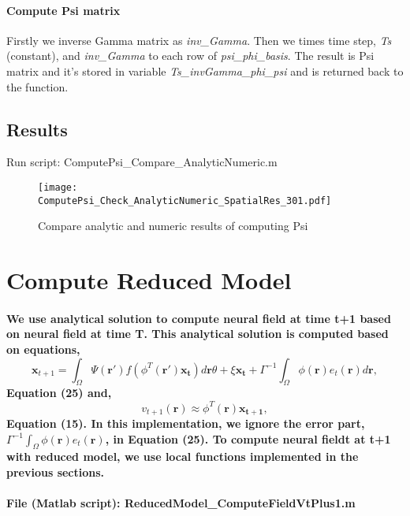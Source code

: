 \documentclass[a4paper, 12pt, english]{article}
\begin{document}
\paragraph{Compute Psi matrix\newline}
Firstly we inverse Gamma matrix as \textit{inv\_Gamma}. Then we times time step, \textit{Ts} (constant), and \textit{inv\_Gamma} to each row of \textit{psi\_phi\_basis}.
The result is Psi matrix and it's stored in variable \textit{Ts\_invGamma\_phi\_psi} and is returned back to the function.

\subsection{Results}
Run script: ComputePsi\_Compare\_AnalyticNumeric.m
\begin{figure}[H]
\centering
\texttt{[image: ComputePsi\_Check\_AnalyticNumeric\_SpatialRes\_301.pdf]}
\caption{Compare analytic and numeric results of computing Psi}
\end{figure}
\newpage




\section{Compute Reduced Model}

\paragraph{We use analytical solution to compute neural field at time t+1 based on
neural field at time T.\newline
This analytical solution is computed based on equations,
$$\boldsymbol{x}_{t+1}=\int_{\Omega}\Psi(\boldsymbol{r}\prime)f(\phi^{T}(\boldsymbol{r\prime})\boldsymbol{x_t})d\boldsymbol{r}\theta + \xi\boldsymbol{x_t} + \Gamma^{-1}\int_{\Omega}\phi(\boldsymbol{r})e_t(\boldsymbol{r})d\boldsymbol{r},$$
Equation (25) and,
$$v_{t+1}(\boldsymbol{r})\approx\phi^T(\boldsymbol{r})\boldsymbol{x_{t+1}}, $$
Equation (15).\newline
In this implementation, we ignore the error part, $\Gamma^{-1}\int_{\Omega}\phi(\boldsymbol{r})e_t(\boldsymbol{r})$, in Equation (25).\newline
To compute neural fieldt at t+1 with reduced model, we use local functions implemented in the previous sections.
}

\paragraph{File (Matlab script): ReducedModel\_ComputeFieldVtPlus1.m}
\end{document}
